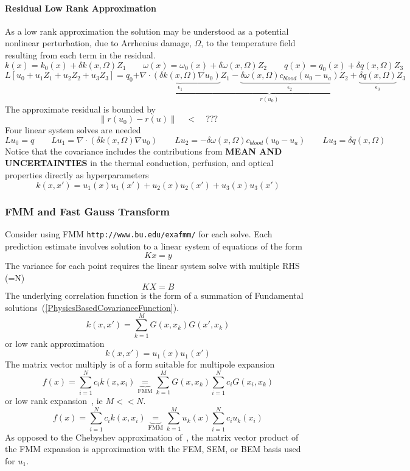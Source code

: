 \documentclass{article}         %
\theoremstyle{definition}
\theoremstyle{remark}
\newcommand{\eqn}[1]{(\ref{#1})}
\begin{document}
\paragraph{Residual Low Rank Approximation} 
As a low rank approximation
the solution may be understood as a potential nonlinear perturbation, 
due to Arrhenius damage, $\Omega$, to the temperature
field resulting from each term in the residual.
\[
 k(x)      =      k_0(x) + \delta    k(x,\Omega)   Z_1
     \qquad
 \omega(x) = \omega_0(x) + \delta \omega(x,\Omega) Z_2
     \qquad
 q(x)      =      q_0(x) + \delta    q(x,\Omega)   Z_3
\]
\[
L \left[u_0 + u_1 Z_1 + u_2 Z_2 + u_3 Z_3\right]
= 
q_0 
 \underbrace{
    + \underbrace{\nabla \cdot ( \delta k(x,\Omega)  \nabla u_0) }_{ \epsilon_1 }Z_1
    - \underbrace{\delta \omega(x,\Omega) c_{blood} (u_0 - u_a ) }_{ \epsilon_2 }Z_2
    + \underbrace{                \delta   q(x,\Omega)           }_{ \epsilon_3 }Z_3
            }_{r(u_0)}
\]
The approximate residual is bounded by
\[
   \|r(u_0) - r(u)\|  \quad < \quad  ???
\]
Four linear system solves are needed
\[
L u_0 = q 
\qquad
L u_1 = \nabla \cdot ( \delta k(x,\Omega)  \nabla u_0) 
\qquad
L u_2 =-\delta \omega(x,\Omega) c_{blood} (u_0 - u_a ) 
\qquad
L u_3 =                   \delta q(x,\Omega)                    
\]
Notice that the covariance includes the contributions from \textbf{MEAN AND UNCERTAINTIES}
in the thermal conduction, perfusion, and optical properties directly as
hyperparameters
\[
k(x,x') = u_1(x) u_1(x') + u_2(x) u_2(x') + u_3(x) u_3(x') 
\]
\subsubsection{FMM and Fast Gauss Transform}
Consider using FMM \texttt{http://www.bu.edu/exafmm/} for each solve.
Each prediction estimate involves solution to a linear system of equations
of the form
\[
   K x= y
\]
The variance for each point requires the linear system solve with multiple
RHS (=N)
\[
  K X = B
\]
The underlying correlation function is the form of a summation of
Fundamental solutions~\eqn{PhysicsBasedCovarianceFunction}.
\[
  k(x,x') = \sum_{k=1}^M  G(x,x_k) G(x',x_k)
\]
or low rank approximation
\[
  k(x,x') = u_1(x) u_1(x')
\]
The matrix vector multiply is of a form suitable for multipole expansion 
\[
f(x) =  \sum_{i=1}^N c_i k(x,x_i) 
 \underbrace{\; = \;}_\text{FMM}
     \sum_{k=1}^M  G(x,x_k) \sum_{i=1}^N c_i  G(x_i,x_k)
\]
or low rank expansion~\cite{fong2009black}, ie $M << N$.
\[
f(x) =  \sum_{i=1}^N c_i k(x,x_i) 
 \underbrace{\; = \;}_\text{FMM}
     \sum_{k=1}^M  u_k(x) \sum_{i=1}^N c_i  u_k(x_i)
\]
As opposed to the Chebyshev approximation of~\cite{fong2009black},
the matrix vector product of the FMM expansion is approximation with the
FEM, SEM, or BEM basis used for $u_1$.
\end{document}
